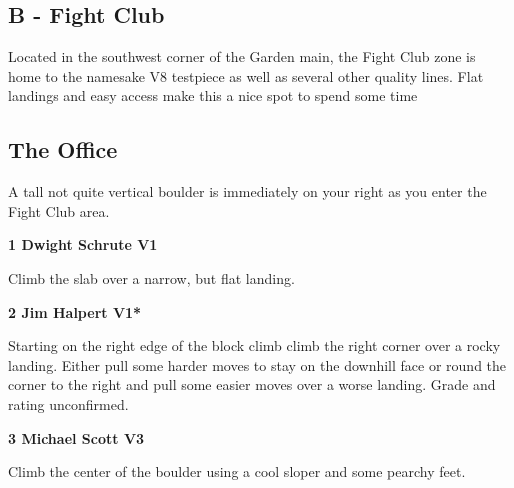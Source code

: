 	\begin{multicols}{2}


\section{B - Fight Club}\label{sa:Fight Club}
Located in the southwest corner of the Garden main, the Fight Club zone is home to the namesake V8 testpiece as well as several other quality lines. Flat landings and easy access make this a nice spot to spend some time\\




\needspace{1.5cm}
\subsection*{The Office}\label{bf:The Office}
A tall not quite vertical boulder is immediately on your right as you enter the Fight Club area.\\
	


\needspace{1.5cm}
\label{rt:Dwight Schrute}
\colorbox{green!20}{
\parbox{0.95\linewidth}{
\textbf{
1 Dwight Schrute V1  \warn
}}}

\begin{adjustwidth}{0.5cm}{}			
Climb the slab over a narrow, but flat landing.
\end{adjustwidth}



\needspace{1.5cm}
\label{rt:Jim Halpert}
\colorbox{green!20}{
\parbox{0.95\linewidth}{
\textbf{
2 Jim Halpert V1*  \warn\warn
}}}

\begin{adjustwidth}{0.5cm}{}			
Starting on the right edge of the block climb climb the right corner over a rocky landing. Either pull some harder moves to stay on the downhill face or round the corner to the right and pull some easier moves over a worse landing. Grade and rating unconfirmed.
\end{adjustwidth}



\needspace{1.5cm}
\label{rt:Michael Scott}
\colorbox{green!20}{
\parbox{0.95\linewidth}{
\textbf{
3 Michael Scott V3  \warn
}}}

\begin{adjustwidth}{0.5cm}{}			
Climb the center of the boulder using a cool sloper and some pearchy feet.
\end{adjustwidth}




\end{multicols}
